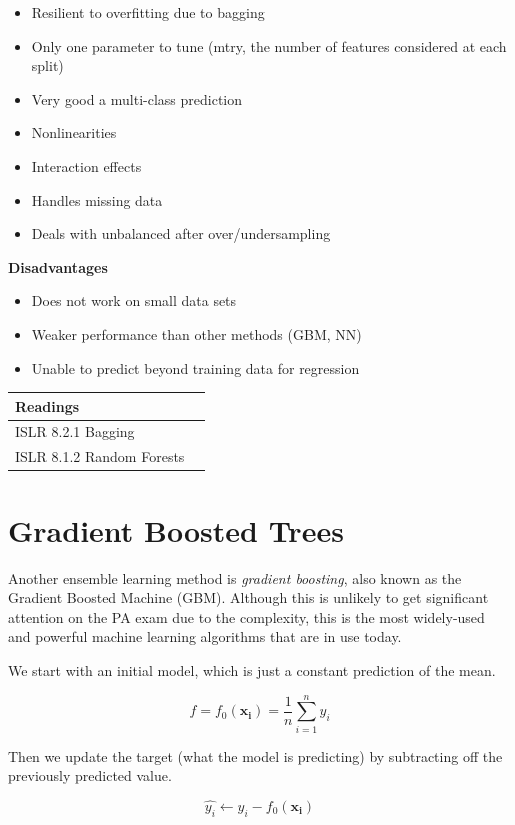 \documentclass[openany]{book}
\providecommand{\tightlist}{%
  \setlength{\itemsep}{0pt}\setlength{\parskip}{0pt}}
\begin{document}
\begin{itemize}
\tightlist
\item
  Resilient to overfitting due to bagging
\item
  Only one parameter to tune (mtry, the number of features considered at each split)
\item
  Very good a multi-class prediction
\item
  Nonlinearities
\item
  Interaction effects
\item
  Handles missing data
\item
  Deals with unbalanced after over/undersampling
\end{itemize}

\textbf{Disadvantages}

\begin{itemize}
\tightlist
\item
  Does not work on small data sets
\item
  Weaker performance than other methods (GBM, NN)
\item
  Unable to predict beyond training data for regression
\end{itemize}

\begin{longtable}[]{@{}ll@{}}
\toprule
Readings &\tabularnewline
\midrule
\endhead
ISLR 8.2.1 Bagging &\tabularnewline
ISLR 8.1.2 Random Forests &\tabularnewline
\bottomrule
\end{longtable}

\hypertarget{gradient-boosted-trees}{%
\section{Gradient Boosted Trees}\label{gradient-boosted-trees}}

Another ensemble learning method is \emph{gradient boosting}, also known as the Gradient Boosted Machine (GBM). Although this is unlikely to get significant attention on the PA exam due to the complexity, this is the most widely-used and powerful machine learning algorithms that are in use today.

We start with an initial model, which is just a constant prediction of the mean.

\[f = f_0(\mathbf{x_i}) = \frac{1}{n}\sum_{i=1}^ny_i\]

Then we update the target (what the model is predicting) by subtracting off the previously predicted value.

\[ \hat{y_i} \leftarrow y_i - f_0(\mathbf{x_i})\]
\end{document}
